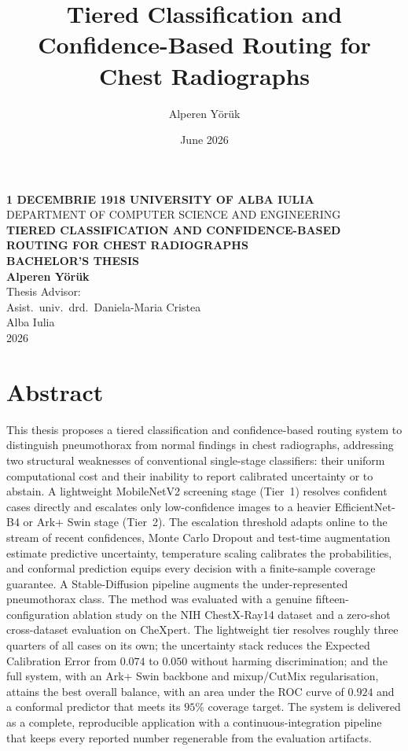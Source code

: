 \documentclass[12pt,a4paper,oneside]{report}
\title{Tiered Classification and Confidence-Based Routing for Chest Radiographs}
\author{Alperen Y\"or\"uk}
\date{June 2026}
\begin{document}

\begin{titlepage}
    \begin{center}
        \vspace*{1cm}
        \Large\textbf{1 DECEMBRIE 1918 UNIVERSITY OF ALBA IULIA}\\
        \large DEPARTMENT OF COMPUTER SCIENCE AND ENGINEERING\\
        \vspace{2.5cm}
        \Large\textbf{TIERED CLASSIFICATION AND CONFIDENCE-BASED ROUTING FOR CHEST RADIOGRAPHS}\\
        \vspace{2cm}
        \large\textbf{BACHELOR'S THESIS}\\
        \vspace{2cm}
        \large\textbf{Alperen Y\"or\"uk}\\
        \vspace{3cm}
        \large Thesis Advisor:\\
        \large Asist.\ univ.\ drd.\ Daniela-Maria Cristea\\
        \vfill
        \large Alba Iulia\\
        \large 2026
    \end{center}
\end{titlepage}

\chapter*{Abstract}
This thesis proposes a tiered classification and confidence-based routing system to distinguish pneumothorax from normal findings in chest radiographs, addressing two structural weaknesses of conventional single-stage classifiers: their uniform computational cost and their inability to report calibrated uncertainty or to abstain. A lightweight MobileNetV2 screening stage (Tier~1) resolves confident cases directly and escalates only low-confidence images to a heavier EfficientNet-B4 or Ark+ Swin stage (Tier~2). The escalation threshold adapts online to the stream of recent confidences, Monte Carlo Dropout and test-time augmentation estimate predictive uncertainty, temperature scaling calibrates the probabilities, and conformal prediction equips every decision with a finite-sample coverage guarantee. A Stable-Diffusion pipeline augments the under-represented pneumothorax class. The method was evaluated with a genuine fifteen-configuration ablation study on the NIH ChestX-Ray14 dataset and a zero-shot cross-dataset evaluation on CheXpert. The lightweight tier resolves roughly three quarters of all cases on its own; the uncertainty stack reduces the Expected Calibration Error from $0.074$ to $0.050$ without harming discrimination; and the full system, with an Ark+ Swin backbone and mixup/CutMix regularisation, attains the best overall balance, with an area under the ROC curve of $0.924$ and a conformal predictor that meets its $95\%$ coverage target. The system is delivered as a complete, reproducible application with a continuous-integration pipeline that keeps every reported number regenerable from the evaluation artifacts.
\end{document}
